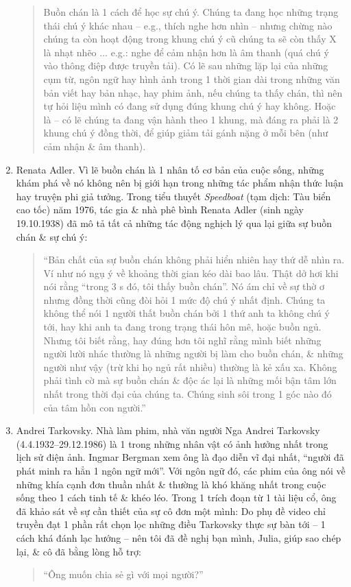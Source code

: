 \documentclass{article}
\begin{document}
\begin{enumerate}
\begin{quote}
		Buồn chán là 1 cách để học sự chú ý. Chúng ta đang học những trạng thái chú ý khác nhau -- e.g., thích nghe hơn nhìn -- nhưng chừng nào chúng ta còn hoạt động trong khung chú ý cũ chúng ta sẽ còn thấy X là nhạt nhẽo $\ldots$ e.g.: nghe để cảm nhận hơn là âm thanh (quá chú ý vào thông điệp được truyền tải). Có lẽ sau những lặp lại của những cụm từ, ngôn ngữ hay hình ảnh trong 1 thời gian dài trong những văn bản viết hay bản nhạc, hay phim ảnh, nếu chúng ta thấy chán, thì nên tự hỏi liệu mình có đang sử dụng đúng khung chú ý hay không. Hoặc là -- có lẽ chúng ta đang vận hành theo 1 khung, mà đáng ra phải là 2 khung chú ý đồng thời, để giúp giảm tải gánh nặng ở mỗi bên (như cảm nhận \& âm thanh).
	\end{quote}
	\item {\sc Renata Adler.} Vì lẽ buồn chán là 1 nhân tố cơ bản của cuộc sống, những khám phá về nó không nên bị giới hạn trong những tác phẩm nhận thức luận hay truyện phi giả tưởng. Trong tiểu thuyết {\it Speedboat} (tạm dịch: Tàu biển cao tốc) năm 1976, tác gia \& nhà phê bình {\sc Renata Adler} (sinh ngày 19.10.1938) đã mô tả tất cả những tác động nghịch lý qua lại giữa sự buồn chán \& sự chú ý:
	\begin{quote}
		 ``Bản chất của sự buồn chán không phải hiển nhiên hay thứ dễ nhìn ra. Ví như nó ngụ ý về khoảng thời gian kéo dài bao lâu. Thật dở hơi khi nói rằng ``trong 3 s đó, tôi thấy buồn chán''. Nó ám chỉ về sự thờ ơ nhưng đồng thời cũng đòi hỏi 1 mức độ chú ý nhất định. Chúng ta không thể nói 1 người thất buồn chán bởi 1 thứ anh ta không chú ý tới, hay khi anh ta đang trong trạng thái hôn mê, hoặc buồn ngủ. Nhưng tôi biết rằng, hay đúng hơn tôi nghĩ rằng mình biết những người lười nhác thường là những người bị làm cho buồn chán, \& những người như vậy (trừ khi họ ngủ rất nhiều) thường là kẻ xấu xa. Không phải tình cờ mà sự buồn chán \& độc ác lại là những mối bận tâm lớn nhất trong thời đại của chúng ta. Chúng sinh sôi trong 1 góc nào đó của tâm hồn con người.''
	\end{quote}
	\item {\sc Andrei Tarkovsky.} Nhà làm phim, nhà văn người Nga {\sc Andrei Tarkovsky} (4.4.1932--29.12.1986) là 1 trong những nhân vật có ảnh hưởng nhất trong lịch sử điện ảnh. {\sc Ingmar Bergman} xem ông là đạo diễn vĩ đại nhất, ``người đã phát minh ra hẳn 1 ngôn ngữ mới''. Với ngôn ngữ đó, các phim của ông nói về những khía cạnh đơn thuần nhất \& thường là khó khăng nhất trong cuộc sống theo 1 cách tinh tế \& khéo léo. Trong 1 trích đoạn từ 1 tài liệu cổ, ông đã khảo sát về sự cần thiết của sự cô đơn một mình: Do phụ đề video chỉ truyền đạt 1 phần rất chọn lọc những điều {\sc Tarkovsky} thực sự bàn tới -- 1 cách khá đánh lạc hướng -- nên tôi đã đề nghị bạn mình, {\sc Julia}, giúp sao chép lại, \& cô đã bằng lòng hỗ trợ:
	\begin{quote}
		``Ông muốn chia sẻ gì với mọi người?''
		

\end{quote}
\end{enumerate}
\end{document}
